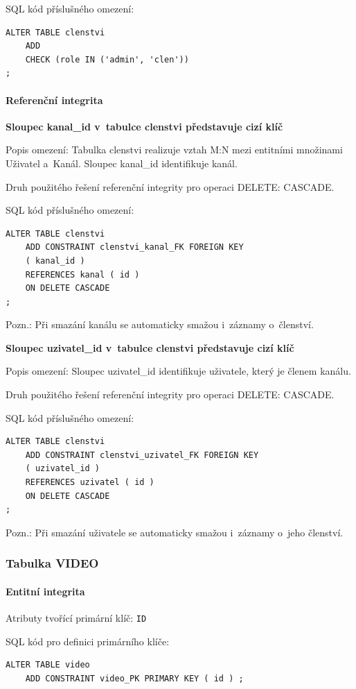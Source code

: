 \documentclass[12pt,a4paper]{article}
\begin{document}
SQL kód příslušného omezení:
\begin{lstlisting}
ALTER TABLE clenstvi
    ADD
    CHECK (role IN ('admin', 'clen'))
;
\end{lstlisting}

\paragraph{Referenční integrita}

\textbf{Sloupec kanal\_id v~tabulce clenstvi představuje cizí klíč}

Popis omezení: Tabulka clenstvi realizuje vztah M:N mezi entitními množinami Uživatel
a~Kanál. Sloupec kanal\_id identifikuje kanál.

Druh použitého řešení referenční integrity pro operaci DELETE: CASCADE.

SQL kód příslušného omezení:
\begin{lstlisting}
ALTER TABLE clenstvi
    ADD CONSTRAINT clenstvi_kanal_FK FOREIGN KEY
    ( kanal_id )
    REFERENCES kanal ( id )
    ON DELETE CASCADE
;
\end{lstlisting}
Pozn.: Při smazání kanálu se automaticky smažou i~záznamy o~členství.

\textbf{Sloupec uzivatel\_id v~tabulce clenstvi představuje cizí klíč}

Popis omezení: Sloupec uzivatel\_id identifikuje uživatele, který je členem kanálu.

Druh použitého řešení referenční integrity pro operaci DELETE: CASCADE.

SQL kód příslušného omezení:
\begin{lstlisting}
ALTER TABLE clenstvi
    ADD CONSTRAINT clenstvi_uzivatel_FK FOREIGN KEY
    ( uzivatel_id )
    REFERENCES uzivatel ( id )
    ON DELETE CASCADE
;
\end{lstlisting}
Pozn.: Při smazání uživatele se automaticky smažou i~záznamy o~jeho členství.

\subsubsection{Tabulka VIDEO}

\paragraph{Entitní integrita}
Atributy tvořící primární klíč: \texttt{ID}

SQL kód pro definici primárního klíče:
\begin{lstlisting}
ALTER TABLE video
    ADD CONSTRAINT video_PK PRIMARY KEY ( id ) ;
\end{lstlisting}
\end{document}
